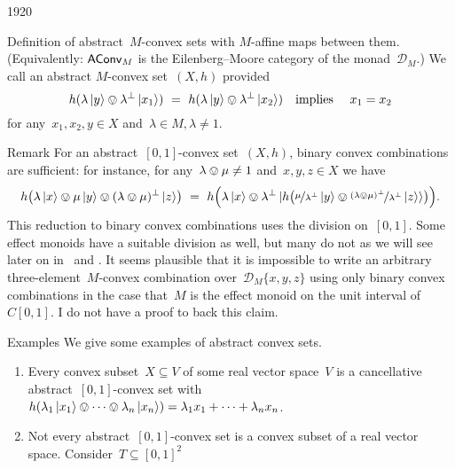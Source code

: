 \begin{parsec}{1920}
\begin{point}{40}{Definition}
    of abstract~$M$-convex sets with
    $M$-affine maps between them.
(Equivalently: $\mathsf{AConv}_M$
    is the Eilenberg--Moore category
    of the monad~$\mathcal{D}_M$.)
We call an abstract $M$-convex set~$(X,h)$ 
provided
\begin{equation*}
    h(\lambda \ket{y} \ovee \lambda^\perp \ket{x_1})\  = \
    h(\lambda \ket{y} \ovee \lambda^\perp \ket{x_2})
    \quad\text{implies}\quad~x_1=x_2
\end{equation*}
    for any~$x_1,x_2,y \in X$ and~$\lambda \in M, \lambda \neq 1$.
\begin{point}{41}{Remark}%
    For an abstract~$[0,1]$-convex set~$(X,h)$,
    binary convex combinations are sufficient:
    for instance, for any~$\lambda \ovee \mu \neq 1$
        and~$x,y,z \in X$ we have
\begin{equation*}
    h \bigl(\lambda \ket{x} \ovee \mu \ket{y} \ovee
        (\lambda \ovee \mu)^\perp \ket{z}\bigr)
        \ = \ 
    h\Bigl(\lambda \ket{x}
        \ovee \lambda^\perp \ket{
            h\bigl( \nicefrac{\mu}{\lambda^\perp} \ket{y}
        \ovee \nicefrac{(\lambda \ovee \mu)^\perp}{\lambda^\perp}
        \ket{z}}\bigr)\Bigr).
\end{equation*}
This reduction to binary convex combinations uses
    the division on~$[0,1]$.
Some effect monoids have a suitable division as well,
        but many do not
    as we will see later on
        in~ and .
It seems plausible that
    it is impossible to write an arbitrary
    three-element~$M$-convex combination
    over~$\mathcal{D}_M \{x,y,z\}$
    using only binary convex combinations
    in the case that~$M$ is the effect monoid
        on the unit interval of~$C[0,1]$.
I do not have a proof to  back this claim.
\end{point}
\end{point}
\begin{point}{50}{Examples}%
We give some examples of abstract convex sets.
\begin{enumerate}
\item
Every convex subset~$X \subseteq V$
    of some real vector space~$V$
    is a cancellative abstract~$[0,1]$-convex set
    with~$h(\lambda_1 \ket{x_1} \ovee \cdots \ovee \lambda_n \ket{x_n})
            = \lambda_1 x_1 + \cdots + \lambda_n x_n$.
\item
Not every abstract~$[0,1]$-convex set is
    a convex subset of a real vector space.
Consider~$T \subseteq [0,1]^2$

\end{enumerate}
\end{point}
\end{parsec}
